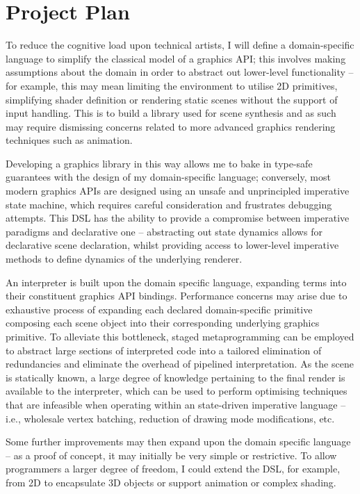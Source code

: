 \documentclass[12pt,twoside]{report}
\begin{document}
\section{Project Plan}

To reduce the cognitive load upon technical artists, I will define a domain-specific language to simplify the classical model of a graphics API; this involves making assumptions about the domain in order to abstract out lower-level functionality -- for example, this may mean limiting the environment to utilise 2D primitives, simplifying shader definition or rendering static scenes without the support of input handling. This is to build a library used for scene synthesis and as such may require dismissing concerns related to more advanced graphics rendering techniques such as animation.

Developing a graphics library in this way allows me to bake in type-safe guarantees with the design of my domain-specific language; conversely, most modern graphics APIs are designed using an unsafe and unprincipled imperative state machine, which requires careful consideration and frustrates debugging attempts. This DSL has the ability to provide a compromise between imperative paradigms and declarative one -- abstracting out state dynamics allows for declarative scene declaration, whilst providing access to lower-level imperative methods to define dynamics of the underlying renderer. 

An interpreter is built upon the domain specific language, expanding terms into their constituent graphics API bindings. Performance concerns may arise due to exhaustive process of expanding each declared domain-specific primitive composing each scene object into their corresponding underlying graphics primitive. To alleviate this bottleneck, staged metaprogramming can be employed to abstract large sections of interpreted code into a tailored elimination of redundancies and eliminate the overhead of pipelined interpretation. As the scene is statically known, a large degree of knowledge pertaining to the final render is available to the interpreter, which can be used to perform optimising techniques that are infeasible when operating within an state-driven imperative language -- i.e., wholesale vertex batching, reduction of drawing mode modifications, etc. 

Some further improvements may then expand upon the domain specific language -- as a proof of concept, it may initially be very simple or restrictive. To allow programmers a larger degree of freedom, I could extend the DSL, for example, from 2D to encapsulate 3D objects or support animation or complex shading. 
\end{document}
